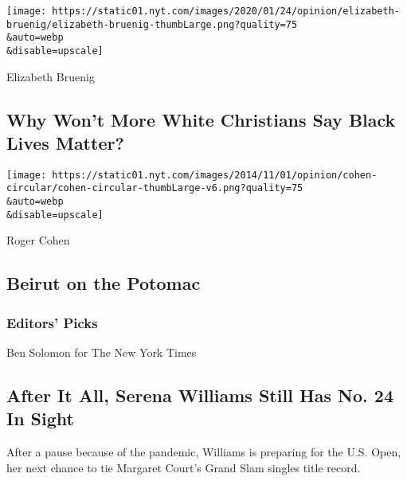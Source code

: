\href{/2020/08/06/opinion/sunday/gloria-purvis-george-floyd-blm.html}{}

\texttt{[image: https://static01.nyt.com/images/2020/01/24/opinion/elizabeth-bruenig/elizabeth-bruenig-thumbLarge.png?quality=75\\\&auto=webp\\\&disable=upscale]}

Elizabeth Bruenig

\hypertarget{why-wont-more-white-christians-say-black-lives-matter}{%
\subsection{Why Won't More White Christians Say Black Lives
Matter?}\label{why-wont-more-white-christians-say-black-lives-matter}}

\href{/2020/08/07/opinion/beirut-explosion.html}{}

\texttt{[image: https://static01.nyt.com/images/2014/11/01/opinion/cohen-circular/cohen-circular-thumbLarge-v6.png?quality=75\\\&auto=webp\\\&disable=upscale]}

Roger Cohen

\hypertarget{beirut-on-the-potomac}{%
\subsection{Beirut on the Potomac}\label{beirut-on-the-potomac}}

\hypertarget{editors-picks}{%
\subsubsection{Editors' Picks}\label{editors-picks}}

\href{/2020/08/07/sports/tennis/serena-williams-us-open.html}{}

Ben Solomon for The New York Times

\href{/2020/08/07/sports/tennis/serena-williams-us-open.html}{}

\hypertarget{after-it-all-serena-williams-still-has-no-24-in-sight}{%
\subsection{After It All, Serena Williams Still Has No. 24 In
Sight}\label{after-it-all-serena-williams-still-has-no-24-in-sight}}

After a pause because of the pandemic, Williams is preparing for the
U.S. Open, her next chance to tie Margaret Court's Grand Slam singles
title record.

\href{/2020/08/08/science/coronavirus-spread-air-conditioning.html}{}

